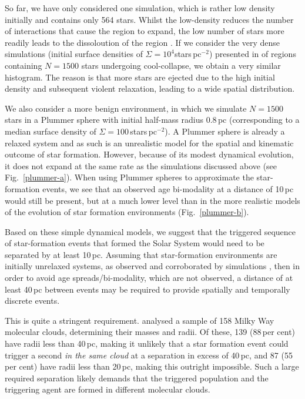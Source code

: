 \documentclass[useAMS,usenatbib,usegraphicx]{mn2e}
\begin{document}
So far, we have only considered one simulation, which is rather low density initially and contains only 564 stars. Whilst the low-density reduces the number of interactions that cause the region to expand, the low number of stars more readily leads to the dissoloution of the region \citep{Gieles12,Moeckel12,Parker12d,Parker13a}. If we consider the very dense simulations (initial surface densities of $\Sigma = 10^4$stars\,pc$^{-2}$) presented in \citet{Parker14b} of regions containing $N = 1500$ stars undergoing cool-collapse, we obtain a very similar histogram. The reason is that more stars are ejected due to the high initial density and subsequent violent relaxation, leading to a wide spatial distribution.

We also consider a more benign environment, in which we simulate $N = 1500$ stars in a Plummer sphere \citep{Plummer11} with initial half-mass radius 0.8\,pc (corresponding to a median surface density of $\Sigma = 100$\,stars\,pc$^{-2}$). A Plummer sphere is already a relaxed system and as such is an unrealistic model for the spatial and kinematic outcome of star formation. However, because of its modest dynamical evolution, it does not expand at the same rate as the simulations discussed above (see Fig.~\ref{plummer-a}). When using Plummer spheres to approximate the star-formation events, we see that an observed age bi-modality at a distance of 10\,pc would still be present, but at a much lower level than in the more realistic models of the evolution of star formation environments (Fig.~\ref{plummer-b}).

Based on these simple dynamical models, we suggest that the triggered sequence of star-formation events that formed the Solar System would need to be separated by at least 10\,pc.  Assuming that star-formation environments are initially unrelaxed systems, as observed \citep{Peretto06,Andre10} and corroborated by simulations \citep{Bate12,Dale12b,Dale14,Parker14b}, then in order to avoid age spreads/bi-modality, which are not observed, a distance of at least 40\,pc between events may be required to provide spatially and temporally discrete events.

This is quite a stringent requirement. \cite{Heyer09} analysed a sample of 158 Milky Way molecular clouds, determining their masses and radii. Of these, 139 (88\,per cent) have radii less than 40\,pc, making it unlikely that a star formation event could trigger a second \emph{in the same cloud} at a separation in excess of 40\,pc, and 87 (55\,per cent) have radii less than 20\,pc, making this outright impossible. Such a large required separation likely demands that the triggered population and the triggering agent are formed in different molecular clouds. 
\end{document}
